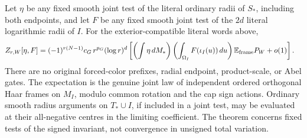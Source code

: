 \begin{theorem}
\label{thm:hall:main}
Let \(\eta\) be any fixed smooth joint test of the literal ordinary
radii of \(S_*\), including both endpoints, and let \(F\) be any
fixed smooth joint test of the \(2d\) literal logarithmic radii of
\(I\). For the exterior-compatible literal words above,
\begin{align}
 Z_{r,W}[\eta,F]
 &=(-1)^{r(N-1)}c_G\,r^{p_G}(\log r)^d
 \left[
       \left(\int\eta\,dM_*\right)
       \left(\int_{\Omega_I}F(\iota_I(u))\,du\right)
       \mathbb E_{\rm frame} P_W+o(1)\right].
 \label{eq:hall:main}
\end{align}
There are no original forced-color prefixes, radial endpoint,
product-scale, or Abel gates. The expectation is the genuine
joint law of independent ordered orthogonal Haar frames on
\(M_I\), modulo common rotation and the cap sign actions.
Ordinary smooth radius arguments on \(T_*\cup I\), if included in a
joint test, may be evaluated at their all-negative centres in the
limiting coefficient. The theorem concerns fixed tests of the
signed invariant, not convergence in unsigned total variation.
\end{theorem}

